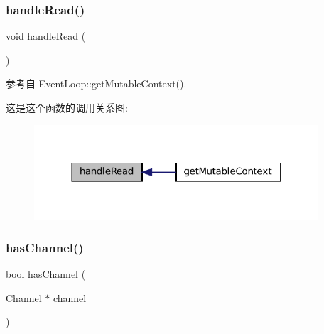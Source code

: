 \mbox{\label{classmuduo_1_1net_1_1EventLoop_a231ec0ec0313193a59b3f1326328ae50}} 
\subsubsection{\texorpdfstring{handle\+Read()}{handleRead()}}
{\footnotesize\ttfamily void handle\+Read (\begin{DoxyParamCaption}{ }\end{DoxyParamCaption})\hspace{0.3cm}{\ttfamily [private]}}



参考自 Event\+Loop\+::get\+Mutable\+Context().

这是这个函数的调用关系图\+:
\nopagebreak
\begin{figure}[H]
\begin{center}
\leavevmode
\includegraphics[width=300pt]{classmuduo_1_1net_1_1EventLoop_a231ec0ec0313193a59b3f1326328ae50_icgraph}
\end{center}
\end{figure}
\mbox{\label{classmuduo_1_1net_1_1EventLoop_a0647c81270e2be2510f0a97dde87e7a1}} 
\subsubsection{\texorpdfstring{has\+Channel()}{hasChannel()}}
{\footnotesize\ttfamily bool has\+Channel (\begin{DoxyParamCaption}\item[{\hyperlink{classmuduo_1_1net_1_1Channel}{Channel} $\ast$}]{channel }\end{DoxyParamCaption})}



